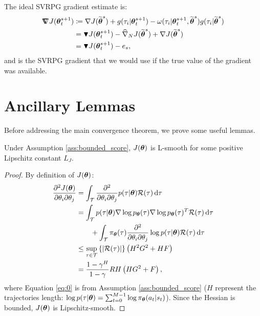 \begin{definition}\label{def:ideal}
	The ideal \acs{SVRPG} gradient estimate is:
	\begin{align*}
	\gradIdeal{\vtheta_t^{s+1}} &\coloneqq 
	\gradJ{\wt{\vtheta}^s}
	+ g(\tau_i|\vtheta^{s+1}_t)
	- \omega(\tau_i|\vtheta^{s+1}_t, \wt{\vtheta}^s) g(\tau_i|\wt{\vtheta}^s)
	\\
	&= \gradBlack{\vtheta_t^{s+1}} - \gradApp{\wt{\vtheta}^s}{N} + \gradJ{\wt{\vtheta}^s} \\
	&= \gradBlack{\vtheta_t^{s+1}} - e_s,
	\end{align*} and is the SVRPG gradient that we would use if the true value of the gradient was available.
\end{definition}


\section{Ancillary Lemmas}\label{sec:ancillarylemmas}

Before addressing the main convergence theorem, we prove some useful lemmas.


\begin{lemma}\label{lemma:lsmooth}
	Under Assumption \ref{ass:bounded_score}, $J(\vtheta)$ is L-smooth for some positive Lipschitz constant $L_J$.
\end{lemma}
\begin{proof}
	By definition of $J(\vtheta)$:
	\begin{align}
	\Dij{J(\vtheta)}{\theta} 
	&= \int_{\Tspace}\Dij{}{\theta}p(\tau|\vtheta)\Reward(\tau)\de \tau
	\nonumber\\ 
	&= \int_{\Tspace}p(\tau|\vtheta)\score{\vtheta}{\tau}\score{\vtheta}{\tau}^T\Reward(\tau)\de \tau\\ 
	&\qquad+ \int_{\Tspace}\pol(\tau)\Dij{}{\theta}\log p(\tau|\vtheta)\Reward(\tau)\de \tau \nonumber\\
	&\leq \sup_{\tau \in \mathcal{T}} \left\{\left|\Reward(\tau)\right|\right\} \left(H^2\GRADLOG^2+H\HESSLOG\right) \label{eq:0}\\
	&= \frac{1-\gamma^H}{1-\gamma}RH\left(H\GRADLOG^2+\HESSLOG\right),\nonumber
	\end{align}
	where Equation \ref{eq:0} is from Assumption \ref{ass:bounded_score} ($H$ represent the trajectories length: $\log p(\tau|\vtheta) = \sum_{t=0}^{M-1}\log\pi_{\vtheta}(a_t\vert s_t)$).
	Since the Hessian is bounded, $J(\vtheta)$ is Lipschitz-smooth.
\end{proof}

